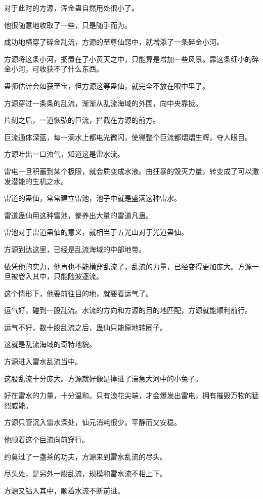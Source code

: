 \begin{this_body}
对于此时的方源，浑金蛊自然用处很小了。

他很随意地收取了一些，只是随手而为。

成功地横穿了碎金乱流，方源的至尊仙窍中，就增添了一条碎金小河。

方源将这条小河，搁置在了小黄天之中，只能算是增加一些风景。靠这条细小的碎金小河，可收获不了什么东西。

蛊师估计会如获至宝，但方源这等蛊仙，就完全不放在眼中里了。

方源穿过一条条的乱流，渐渐从乱流海域的外围，向中央靠拢。

片刻之后，一道恢弘的巨流，拦截在方源的前方。

巨流通体深蓝，每一滴水上都电光微闪，使得整个巨流都熠熠生辉，夺人眼目。

方源吐出一口浊气，知道这是雷水流。

雷电一旦积蓄到某个极限，就会质变成水液。由狂暴的毁灭力量，转变成了可以激发潜能的生机之水。

雷道的蛊仙，常常建立雷池，池子中就是盛满这种雷水。

雷道蛊仙用这种雷池，豢养出大量的雷道凡蛊。

雷池对于雷道蛊仙的意义，就相当于五光山对于光道蛊仙。

方源到达这里，已经是乱流海域的中部地带。

依凭他的实力，他再也不能横穿乱流了。乱流的力量，已经变得更加庞大。方源一旦被卷入其中，只能随波逐流。

这个情形下，他要前往目的地，就要看运气了。

运气好，碰到一股乱流。水流的方向和方源的目的地匹配，方源就能顺利前行。

运气不好，数十股乱流之后，蛊仙只能原地转圈子。

这就是乱流海域的奇特地貌。

方源进入雷水乱流当中。

这股乱流十分庞大。方源就好像是掉进了湍急大河中的小兔子。

好在雷水的力量，十分温和。只有浪花尖端，才会爆发出雷电，拥有摧毁万物的猛烈威能。

方源只管沉入雷水深处，仙元消耗很少。平静而又安稳。

他顺着这个巨流向前穿行。

约莫过了一盏茶的功夫，方源来到雷水乱流的尽头。

尽头处，是另外一股乱流，规模和雷水流不相上下。

方源又钻入其中，顺着水流不断前进。


\end{this_body}
